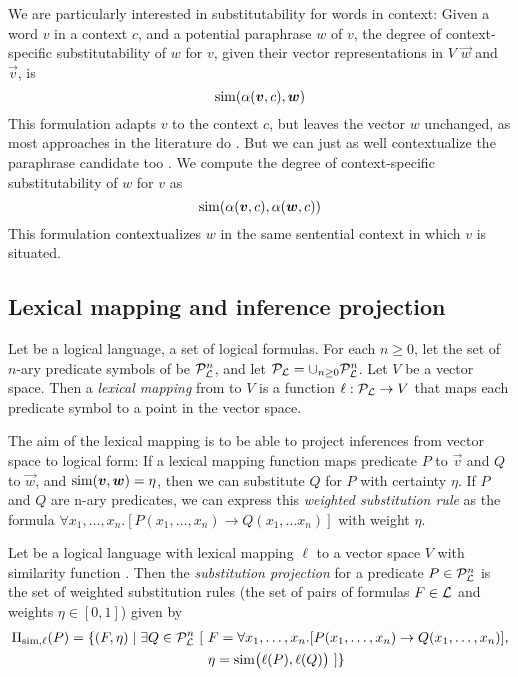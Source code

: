 We are particularly interested in substitutability for words in context: Given a
word $v$ in a context $c$, and a potential paraphrase $w$ of $v$, the degree of
context-specific substitutability of $w$ for $v$, given their vector
representations in $V$ $\vec w$ and $\vec v$, is \[ \simfunc(\alpha(\vec v, c), \vec
w)\] This formulation adapts $v$ to the context $c$, but leaves the vector $w$ 
unchanged, as most approaches in the literature do 
\citep{erk:emnlp08,MitchellLapata:08,ThaterFuerstenauPinkal:10,vandecruys:emnlp2011}.
But we can just as well contextualize the paraphrase candidate
too \citep{erk:acl2010}. We compute the degree of context-specific
substitutability of $w$ for $v$ as \[ \simfunc(\alpha(\vec v, c), \alpha(\vec w, c)) \]
This formulation contextualizes $w$ in the same sentential context in which $v$
is situated.


\subsection*{Lexical mapping and inference projection} 

Let \loglang be a logical language, a set of logical formulas. For each $n \ge
0$, let the set of $n$-ary predicate symbols of \loglang be
${\cal{P}}_{{\cal{L}}}^n$, and let ${\cal{P}}_{{\cal{L}}} = \cup_{n \ge 0}
{\cal{P}}_{{\cal{L}}}^n$. Let $V$ be a vector space. Then a \emph{lexical mapping}
from \loglang to $V$ is a function $\ell:
{\cal{P}}_{{\cal{L}}} \to V$ that maps each predicate symbol to a point in the
vector space.

The aim of the lexical mapping is to be able to project inferences from vector
space to logical form: If a lexical mapping function maps predicate $P$ to $\vec
v$ and $Q$ to $ \vec w$, and $\simfunc(\vec v, \vec w) = \eta$, then we can substitute
$Q$ for $P$ with certainty $\eta$. If $P$ and $Q$ are n-ary predicates, we can
express this {\it weighted substitution rule} as the formula $\forall x_1,
\ldots, x_n.[P(x_1, \ldots, x_n) \to Q(x_1, \ldots x_n)]$ with weight $\eta$.

Let \loglang be a logical language with lexical mapping $\ell$ to a vector space
$V$ with similarity function \simfunc. Then the \textit{substitution projection} 
for a predicate $P \in {\cal{P}}_{{\cal{L}}}^n$ is the set of weighted substitution
rules (the set of pairs of formulas $F \in {\cal{L}}$ and weights $\eta \in
[0,1]$) given by
\begin{align*}
\Pi_{\mathrm{sim}, \ell}(P) = \{ (F, \eta) \mid \exists Q \in {\cal{P}}_{{\cal{L}}}^n~[ 
&~F = \forall x_1, \ldots, x_n.[P(x_1, \ldots, x_n) \to Q(x_1, \ldots, x_n)], \\
&~\eta = \mathrm{sim}\big(\ell(P), \ell(Q)\big) ~] \}
\end{align*}

